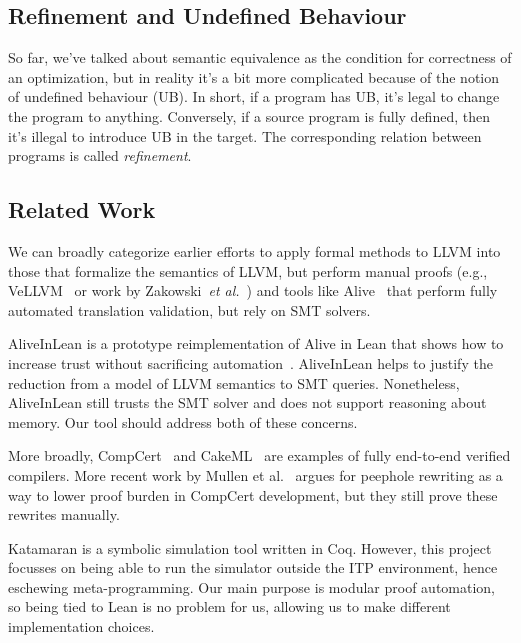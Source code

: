 \documentclass[a4paper]{scrartcl}
\newcommand*{\etal}{~\emph{et al.}}
\begin{document}
\subsection{Refinement and Undefined
Behaviour}\label{refinement-and-undefined-behaviour}

So far, we've talked about semantic equivalence as the condition for
correctness of an optimization, but in reality it's a bit more
complicated because of the notion of undefined behaviour (UB). In short,
if a program has UB, it's legal to change the program to anything.
Conversely, if a source program is fully defined, then it's illegal to
introduce UB in the target. The corresponding relation between programs
is called \emph{refinement}. 

\subsection{Related Work}

We can broadly categorize earlier efforts to apply formal methods to
LLVM into those that formalize the semantics of LLVM, but perform manual
proofs (e.g., VeLLVM~\cite{zhaoFormalVerificationSSABased, zhaoFormalizingLLVMIntermediate2012} 
or work by Zakowski\etal{}~\cite{zakowskiModularCompositionalExecutable2021}) and tools
like Alive~\cite{lopesAlive2BoundedTranslation2021} that perform
fully automated translation validation, but rely on SMT solvers.

AliveInLean is a prototype reimplementation of Alive in Lean that shows how to increase trust without
sacrificing automation~\cite{leeAliveInLeanVerifiedLLVM2019}. AliveInLean helps to justify the reduction from a model of LLVM semantics
to SMT queries. Nonetheless, AliveInLean still trusts the SMT solver and does not support reasoning about memory. 
Our tool should address both of these concerns.

More broadly, CompCert~\cite{leroyCompCertFormallyVerified} and
CakeML~\cite{kumarCakeMLVerifiedImplementation2014} are examples
of fully end-to-end verified compilers. More recent work by Mullen et
al.~\cite{mullenVerifiedPeepholeOptimizations2016} argues for
peephole rewriting as a way to lower proof burden in CompCert
development, but they still prove these rewrites manually.

Katamaran \cite{keuchelVerifiedSymbolicExecution2022} is a
symbolic simulation tool written in Coq. However, this
project focusses on being able to run the simulator outside the ITP
environment, hence eschewing meta-programming. Our main purpose is
modular proof automation, so being tied to Lean is no problem for us,
allowing us to make different implementation choices.
\end{document}
